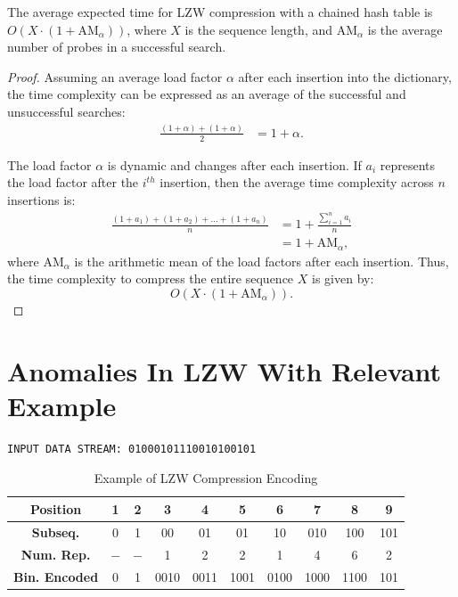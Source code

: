 \documentclass[12pt, a4paper]{article}
\begin{document}
\begin{theorem}
The average expected time for LZW compression with a chained hash table is \( O(X \cdot (1 + \text{AM}_{\alpha})) \), where \( X \) is the sequence length, and \( \text{AM}_{\alpha} \) is the average number of probes in a successful search.
\end{theorem}

\begin{proof}
Assuming an average load factor \( \alpha \) after each insertion into the dictionary, the time complexity can be expressed as an average of the successful and unsuccessful searches:
\begin{align*}
\frac{(1 + \alpha) + (1 + \alpha)}{2} &= 1 + \alpha.
\end{align*}

The load factor \( \alpha \) is dynamic and changes after each insertion. If \( a_i \) represents the load factor after the \( i^{th} \) insertion, then the average time complexity across \( n \) insertions is:
\begin{align*}
\frac{(1 + a_1) + (1 + a_2) + \ldots + (1 + a_n)}{n} &= 1 + \frac{\sum_{i=1}^{n} a_i}{n} \\
&= 1 + \text{AM}_{\alpha},
\end{align*}
where \( \text{AM}_{\alpha} \) is the arithmetic mean of the load factors after each insertion. Thus, the time complexity to compress the entire sequence \( X \) is given by:
\[
O(X \cdot (1 + \text{AM}_{\alpha})).
\]
\end{proof}
 \section{Anomalies In LZW With Relevant Example}
\begin{verbatim}
INPUT DATA STREAM: 01000101110010100101
\end{verbatim}

\begin{table}[h!]
\centering
\begin{tabular}{@{}cccccccccc@{}}
\toprule
\textbf{Position} & 1 & 2 & 3 & 4 & 5 & 6 & 7 & 8 & 9 \\ \midrule
\textbf{Subseq.} & 0 & 1 & 00 & 01 & 01 & 10 & 010 & 100 & 101 \\
\textbf{Num. Rep.} & $-$ & $-$ & 1 & 2 & 2 & 1 & 4 & 6 & 2 \\
\textbf{Bin. Encoded} & 0 & 1 & 0010 & 0011 & 1001 & 0100 & 1000 & 1100 & 101 \\ \bottomrule
\end{tabular}
\caption{Example of LZW Compression Encoding}
\label{tab:lzw_example}
\end{table}
\end{document}

